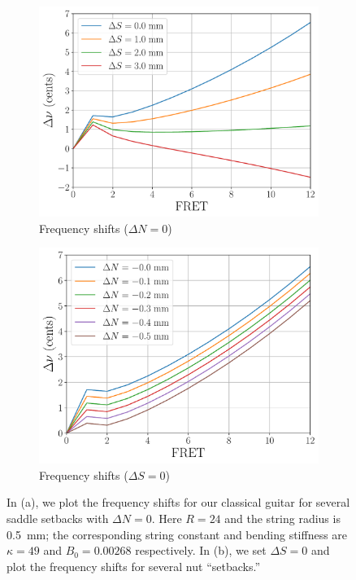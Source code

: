 \begin{figure}
    \centering
    \begin{subfigure}[b]{0.8\textwidth}
        \centering
        \includegraphics[width=5.0in]{../figures/comp_ds}
        \caption{Frequency shifts ($\Delta N = 0$)}
        \label{fig:comp_ds}
    \end{subfigure}
    \par\vspace{0.25in}
    \begin{subfigure}[b]{0.8\textwidth}
        \centering
        \includegraphics[width=5.0in]{../figures/comp_dn}
        \caption{Frequency shifts ($\Delta S = 0$)}
        \label{fig:comp_dn}
    \end{subfigure}
    \caption{\label{fig:comp_dsdn} In (a), we plot the frequency shifts for our classical guitar for several saddle setbacks with $\Delta N = 0$. Here $R = 24$ and the string radius is 0.5~mm; the corresponding string constant and bending stiffness are $\kappa = 49$ and $B_0 = 0.00268$ respectively. In (b), we set $\Delta S = 0$ and plot the frequency shifts for several nut ``setbacks.''}
  \end{figure}
  
